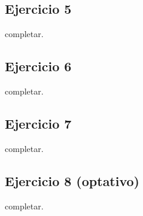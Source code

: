 \vspace*{0.5cm} \noindent



\newpage





\subsection*{Ejercicio 5}

\vspace*{0.3cm} \noindent

completar.

\newpage





\subsection*{Ejercicio 6}

\vspace*{0.3cm} \noindent

completar.

\newpage





\subsection*{Ejercicio 7}

\vspace*{0.3cm} \noindent

completar.

\newpage





\subsection*{Ejercicio 8 (optativo)}

\vspace*{0.3cm} \noindent

completar.

\newpage
